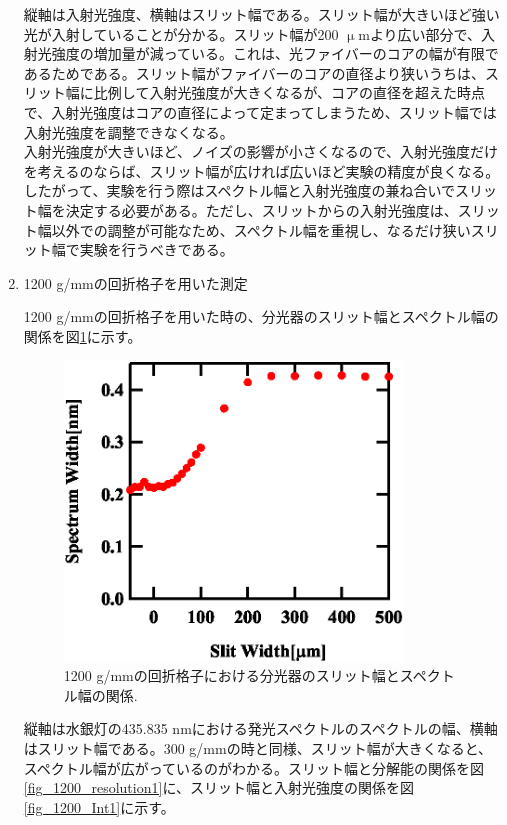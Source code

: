 \documentclass[11pt,a4j]{jsarticle}
\begin{document}
\begin{enumerate}
       縦軸は入射光強度、横軸はスリット幅である。スリット幅が大きいほど強い光が入射していることが分かる。スリット幅が200 $\upmu$mより広い部分で、入射光強度の増加量が減っている。これは、光ファイバーのコアの幅が有限であるためである。スリット幅がファイバーのコアの直径より狭いうちは、スリット幅に比例して入射光強度が大きくなるが、コアの直径を超えた時点で、入射光強度はコアの直径によって定まってしまうため、スリット幅では入射光強度を調整できなくなる。\\
       入射光強度が大きいほど、ノイズの影響が小さくなるので、入射光強度だけを考えるのならば、スリット幅が広ければ広いほど実験の精度が良くなる。したがって、実験を行う際はスペクトル幅と入射光強度の兼ね合いでスリット幅を決定する必要がある。ただし、スリットからの入射光強度は、スリット幅以外での調整が可能なため、スペクトル幅を重視し、なるだけ狭いスリット幅で実験を行うべきである。

       \newpage

 \item 1200 g/mmの回折格子を用いた測定


       1200 g/mmの回折格子を用いた時の、分光器のスリット幅とスペクトル幅の関係を図\ref{fig_1200spectrum1}に示す。

       \begin{figure}[ht]
        \centering
        \includegraphics[clip,width=9cm]{start1_1200Spectrum1.eps}
        \caption{1200 g/mmの回折格子における分光器のスリット幅とスペクトル幅の関係.}
        \label{fig_1200spectrum1}
       \end{figure}


       縦軸は水銀灯の435.835 nmにおける発光スペクトルのスペクトルの幅、横軸はスリット幅である。300 g/mmの時と同様、スリット幅が大きくなると、スペクトル幅が広がっているのがわかる。スリット幅と分解能の関係を図\ref{fig_1200_resolution1}に、スリット幅と入射光強度の関係を図\ref{fig_1200_Int1}に示す。


\end{enumerate}
\end{document}
